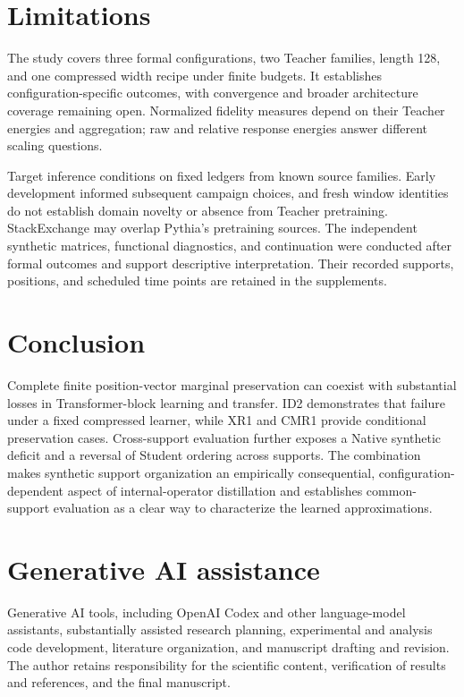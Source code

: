 \section{Limitations}\label{limitations}

The study covers three formal configurations, two Teacher families, length 128, and one compressed width recipe under finite budgets. It establishes configuration-specific outcomes, with convergence and broader architecture coverage remaining open. Normalized fidelity measures depend on their Teacher energies and aggregation; raw and relative response energies answer different scaling questions.

Target inference conditions on fixed ledgers from known source families. Early development informed subsequent campaign choices, and fresh window identities do not establish domain novelty or absence from Teacher pretraining. StackExchange may overlap Pythia's pretraining sources. The independent synthetic matrices, functional diagnostics, and continuation were conducted after formal outcomes and support descriptive interpretation. Their recorded supports, positions, and scheduled time points are retained in the supplements.

\section{Conclusion}\label{conclusion}

Complete finite position-vector marginal preservation can coexist with substantial losses in Transformer-block learning and transfer. ID2 demonstrates that failure under a fixed compressed learner, while XR1 and CMR1 provide conditional preservation cases. Cross-support evaluation further exposes a Native synthetic deficit and a reversal of Student ordering across supports. The combination makes synthetic support organization an empirically consequential, configuration-dependent aspect of internal-operator distillation and establishes common-support evaluation as a clear way to characterize the learned approximations.

\section*{Generative AI assistance}\label{generative-ai-assistance}

Generative AI tools, including OpenAI Codex and other language-model assistants, substantially assisted research planning, experimental and analysis code development, literature organization, and manuscript drafting and revision. The author retains responsibility for the scientific content, verification of results and references, and the final manuscript.


